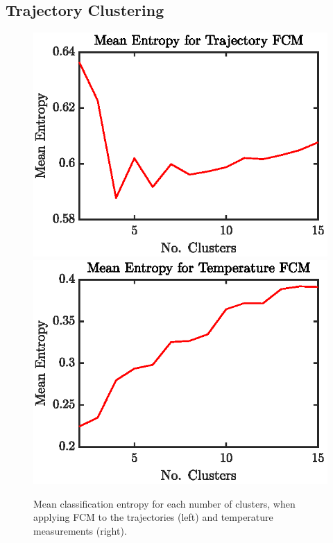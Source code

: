 \documentclass[a4paper, fontsize=12pt]{article}
\begin{document}
\subsection{Trajectory Clustering}
\begin{figure}%
\begin{center}
	\includegraphics[scale=1]{../figures/atlantic_ent_traj.eps}%
	\includegraphics[scale=1]{../figures/atlantic_ent_temp.eps}
	\caption{Mean classification entropy for each number of clusters, when applying FCM to the trajectories (left) and temperature measurements (right).}
	\label{fig:ent_traj_temp}
\end{center}
\end{figure}
\end{document}
